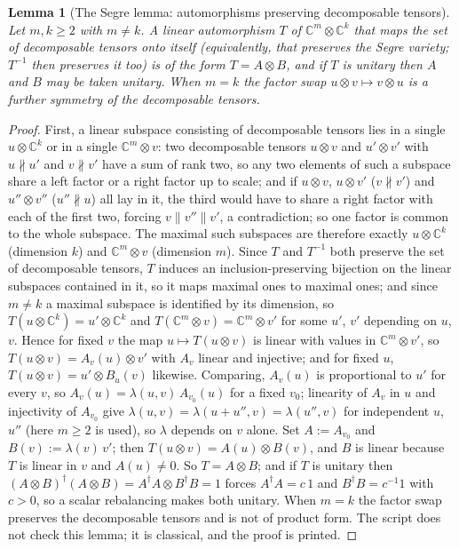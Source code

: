 \documentclass[11pt]{article}
\newtheorem{lemma}[theorem]{Lemma}
\theoremstyle{definition}
\theoremstyle{plain}
\providecommand{\C}{}\renewcommand{\C}{\mathbb{C}}
\begin{document}
\begin{lemma}[The Segre lemma: automorphisms preserving decomposable tensors]\label{c:standard-model.segre-lemma-automorphisms-preserving-decomposable-tensors}
Let $m, k \ge 2$ with $m \neq k$. A linear automorphism $T$ of $\C^{m} \otimes \C^{k}$ that maps the set of decomposable tensors onto itself (equivalently, that preserves the Segre variety; $T^{-1}$ then preserves it too) is of the form $T = A \otimes B$, and if $T$ is unitary then $A$ and $B$ may be taken unitary. When $m = k$ the factor swap $u \otimes v \mapsto v \otimes u$ is a further symmetry of the decomposable tensors.
\end{lemma}
\begin{proof}
First, a linear subspace consisting of decomposable tensors lies in a single $u \otimes \C^{k}$ or in a single $\C^{m} \otimes v$: two decomposable tensors $u \otimes v$ and $u' \otimes v'$ with $u \nparallel u'$ and $v \nparallel v'$ have a sum of rank two, so any two elements of such a subspace share a left factor or a right factor up to scale; and if $u \otimes v$, $u \otimes v'$ ($v \nparallel v'$) and $u'' \otimes v''$ ($u'' \nparallel u$) all lay in it, the third would have to share a right factor with each of the first two, forcing $v \parallel v''\parallel v'$, a contradiction; so one factor is common to the whole subspace. The maximal such subspaces are therefore exactly $u \otimes \C^{k}$ (dimension $k$) and $\C^{m} \otimes v$ (dimension $m$). Since $T$ and $T^{-1}$ both preserve the set of decomposable tensors, $T$ induces an inclusion-preserving bijection on the linear subspaces contained in it, so it maps maximal ones to maximal ones; and since $m \neq k$ a maximal subspace is identified by its dimension, so $T(u \otimes \C^{k}) = u' \otimes \C^{k}$ and $T(\C^{m} \otimes v) = \C^{m} \otimes v'$ for some $u'$, $v'$ depending on $u$, $v$. Hence for fixed $v$ the map $u \mapsto T(u \otimes v)$ is linear with values in $\C^{m} \otimes v'$, so $T(u \otimes v) = A_{v}(u) \otimes v'$ with $A_{v}$ linear and injective; and for fixed $u$, $T(u \otimes v) = u' \otimes B_{u}(v)$ likewise. Comparing, $A_{v}(u)$ is proportional to $u'$ for every $v$, so $A_{v}(u) = \lambda(u, v)\,A_{v_{0}}(u)$ for a fixed $v_{0}$; linearity of $A_{v}$ in $u$ and injectivity of $A_{v_{0}}$ give $\lambda(u, v) = \lambda(u + u'', v) = \lambda(u'', v)$ for independent $u$, $u''$ (here $m \ge 2$ is used), so $\lambda$ depends on $v$ alone. Set $A := A_{v_{0}}$ and $B(v) := \lambda(v)\,v'$; then $T(u \otimes v) = A(u) \otimes B(v)$, and $B$ is linear because $T$ is linear in $v$ and $A(u) \neq 0$. So $T = A \otimes B$; and if $T$ is unitary then $(A \otimes B)^{\dagger}(A \otimes B) = A^{\dagger}A \otimes B^{\dagger}B = 1$ forces $A^{\dagger}A = c\,1$ and $B^{\dagger}B = c^{-1}1$ with $c > 0$, so a scalar rebalancing makes both unitary. When $m = k$ the factor swap preserves the decomposable tensors and is not of product form. The script does not check this lemma; it is classical, and the proof is printed.

\end{proof}
\end{document}
